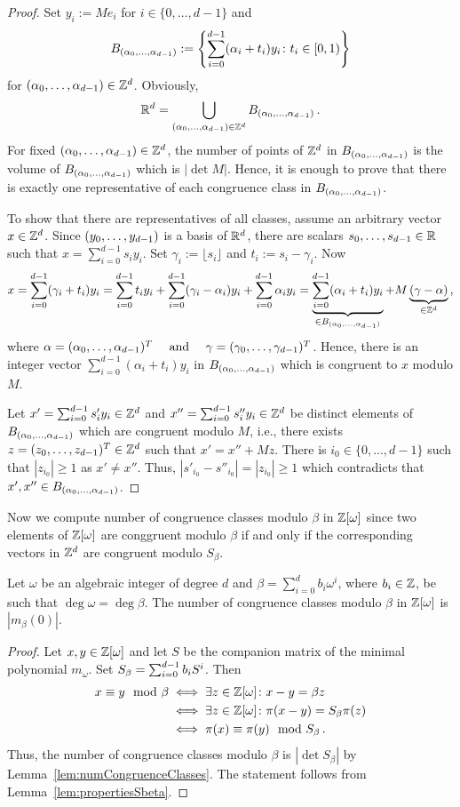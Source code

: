 \begin{proof}
Set $y_i:=M e_i$ for $i\in\{0, \dots, d-1 \}$ and 
$$
B_{({\alpha}_0,\ldots,{\alpha}_{d-1})}:=\left\{\sum_{i=0}^{d-1} (\alpha_i + t_i) y_i \colon t_i \in [0,1)\right\}
$$
for $({\alpha}_0,\ldots,{\alpha}_{d-1}) \in \mathbb{Z}^d$. Obviously,
$$
\mathbb{R}^d=\bigcup_{({\alpha}_0,\ldots,{\alpha}_{d-1}) \in \mathbb{Z}^d} B_{({\alpha}_0,\ldots,{\alpha}_{d-1})}\,.
$$
For fixed $({\alpha}_0,\ldots,{\alpha}_{d-1}) \in \mathbb{Z}^d$, the number of points of $\mathbb{Z}^d$ in $B_{({\alpha}_0,\ldots,{\alpha}_{d-1})}$  is the volume of $B_{({\alpha}_0,\ldots,{\alpha}_{d-1})}$  which is $|\det M|$. Hence, it is enough to prove that there is exactly one representative of each congruence class in $B_{({\alpha}_0,\ldots,{\alpha}_{d-1})}$. 

To show that there are representatives of all classes, assume an arbitrary vector $x\in\mathbb{Z}^d$. Since $({y}_0,\ldots,{y}_{d-1})$ is a basis of $\mathbb{R}^d$, there are scalars $s_0, \dots, s_{d-1}\in \mathbb{R}$ such that $x= \sum_{i=0}^{d-1} s_i y_i$. Set $\gamma_i:=\lfloor s_i \rfloor$ and $t_i:=s_i-\gamma_i$. Now
\begin{align*}
 x=\sum_{i=0}^{d-1} (\gamma_i+t_i) y_i=\sum_{i=0}^{d-1}t_i y_i +\sum_{i=0}^{d-1} (\gamma_i-\alpha_i)y_i + \sum_{i=0}^{d-1} \alpha_i y_i=\underbrace{\sum_{i=0}^{d-1} (\alpha_i+t_i)y_i}_{\in B_{({\alpha}_0,\ldots,{\alpha}_{d-1})} } +M\underbrace{(\gamma-\alpha)}_{\in\mathbb{Z}^d}\,,
\end{align*}
where $\alpha=({\alpha}_0,\ldots,{\alpha}_{d-1})^T \quad \text{ and }\quad \gamma=({\gamma}_0,\ldots,{\gamma}_{d-1})^T$. Hence, there is an integer vector $\sum_{i=0}^{d-1} (\alpha_i+t_i)y_i$ in $B_{({\alpha}_0,\ldots,{\alpha}_{d-1})}$ which is congruent to $x$ modulo $M$.

Let $x'=\sum_{i=0}^{d-1} s'_i y_i \in \mathbb{Z}^d$ and $x''=\sum_{i=0}^{d-1}s''_i y_i \in \mathbb{Z}^d$ be distinct elements of $B_{({\alpha}_0,\ldots,{\alpha}_{d-1})}$ which are congruent modulo $M$, i.e., there exists $z=({z}_0,\ldots,{z}_{d-1})^T\in\mathbb{Z}^d$ such that $x'=x''+M z$. There is $i_0\in\{0, \dots , d-1\}$ such that $|z_{i_0}|\geq 1$ as $x'\neq x''$. Thus, $|s'_{i_0}-s''_{i_0}|=|z_{i_0}|\geq 1$ which contradicts that  $x', x''\in B_{({\alpha}_0,\ldots,{\alpha}_{d-1})}$.
\end{proof}
Now we compute number of congruence classes modulo $\beta$ in $\mathbb{Z}[\omega]$ since two elements of $\mathbb{Z}[\omega]$ are conggruent modulo $\beta$ if and only if the corresponding vectors in $\mathbb{Z}^d$ are congruent modulo $S_\beta$.
\begin{thm}
Let $\omega$ be an algebraic integer of degree $d$ and  $\beta=\sum_{i=0}^d b_i \omega^i$, where $b_i\in\mathbb{Z}$, be such that $\deg \omega = \deg\beta$. The number of congruence classes modulo $\beta$ in $\mathbb{Z}[\omega]$ is $|m_\beta(0)|$.
\label{thm:numbCongruenceClasses}
\end{thm}
\begin{proof}
Let $x, y\in\mathbb{Z}[\omega]$ and let $S$ be the companion matrix of the minimal polynomial $m_\omega$. Set $S_\beta=\sum_{i=0}^{d-1} {b}_i S^i$. Then
\begin{align*}
x\equiv y \mod \beta &\iff \exists z \in \mathbb{Z}[\omega] \colon x-y= \beta z \\
&\iff \exists z \in \mathbb{Z}[\omega] \colon \pi(x-y)= S_\beta \pi(z) \\
&\iff \pi(x) \equiv \pi(y) \mod S_\beta\,.
\end{align*}
Thus, the number of congruence classes modulo $\beta$ is $|\det S_\beta|$ by Lemma~\ref{lem:numCongruenceClasses}. The statement follows from Lemma~\ref{lem:propertiesSbeta}. 
\end{proof}